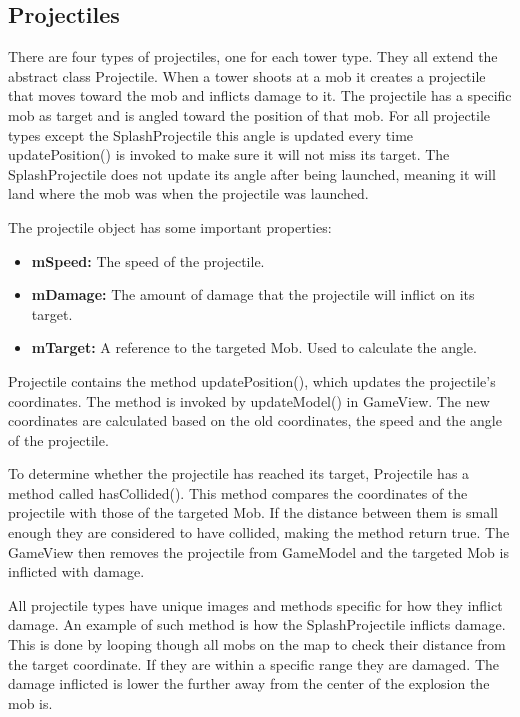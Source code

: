 \subsection{Projectiles}

There are four types of projectiles, one for each tower type. They all extend the abstract class Projectile. When a tower shoots at a mob it creates a projectile that moves toward the mob and inflicts damage to it. The projectile has a specific mob as target and is angled toward the position of that mob. For all projectile types except the SplashProjectile this angle is updated every time updatePosition() is invoked to make sure it will not miss its target. The SplashProjectile does not update its angle after being launched, meaning it will land where the mob was when the projectile was launched.

The projectile object has some important properties:

\begin{itemize}
\item {\bf mSpeed:} The speed of the projectile.
\item {\bf mDamage:} The amount of damage that the projectile will inflict on its target.
\item {\bf mTarget:} A reference to the targeted Mob. Used to calculate the angle.
\end{itemize}

Projectile contains the method updatePosition(), which updates the projectile's coordinates. The method is invoked by updateModel() in GameView. The new coordinates are calculated based on the old coordinates, the speed and the angle of the projectile.

To determine whether the projectile has reached its target, Projectile has a method called hasCollided(). This method compares the coordinates of the projectile with those of the targeted Mob. If the distance between them is small enough they are considered to have collided, making the method return true. The GameView then removes the projectile from GameModel and the targeted Mob is inflicted with damage.

All projectile types have unique images and methods specific for how they inflict damage. An example of such method is how the SplashProjectile inflicts damage. This is done by looping though all mobs on the map to check their distance from the target coordinate. If they are within a specific range they are damaged. The damage inflicted is lower the further away from the center of the explosion the mob is.

